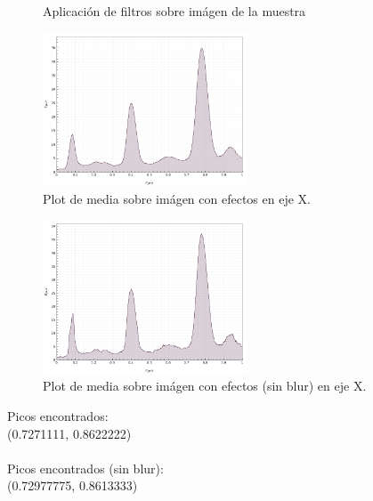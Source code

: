 \begin{itemize}
\begin{figure}[H]
	\caption{Aplicaci\'on de filtros sobre im\'agen de la muestra}
	\centering
	\end{figure}
	\begin{figure}[H]
	  \vspace{-0.2cm}
	  \centering
	  \includegraphics[width=230px]{imagenes-jtlc/experimento/search-peaks/6/plot-x}
	  \centering
	  \vspace{-0.4cm}
	  \caption{Plot de media sobre im\'agen con efectos en eje X.}
	  \label{fig:sp-6-plot-x-no-blur--repetido}
	  \vspace{-0.15cm}
	\end{figure}
	\begin{figure}[H]
	  \vspace{-0.2cm}
	  \centering
	  \includegraphics[width=230px]{imagenes-jtlc/experimento/search-peaks/6/plot-x-no-blur}
	  \centering
	  \vspace{-0.4cm}
	  \caption{Plot de media sobre im\'agen con efectos (sin blur) en eje X.}
	  \label{fig:sp-6-plot-x-no-blur}
	  \vspace{-0.15cm}
	\end{figure}
	Picos encontrados: \\
	(0.7271111, 0.8622222)\\ \\
	Picos encontrados (sin blur): \\
	(0.72977775, 0.8613333) \\
	
\end{itemize}
